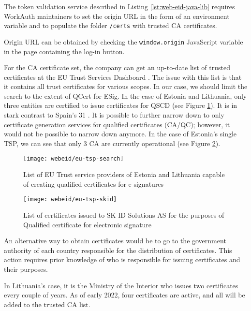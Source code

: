 The token validation service described in Listing \ref{lst:web-eid-java-lib} requires WorkAuth maintainers to set the origin URL in the form of an environment variable and to populate the folder \texttt{/certs} with trusted CA certificates.

Origin URL can be obtained by checking the \texttt{window.origin} JavaScript variable in the page containing the log-in button.

For the CA certificate set, the company can get an up-to-date list of trusted certificates at the EU Trust Services Dashboard \cite{eu-trustservices}. The issue with this list is that it contains all trust certificates for various scopes. In our case, we should limit the search to the extent of QCert for ESig. In the case of Estonia and Lithuania, only three entities are certified to issue certificates for QSCD (see Figure \ref{fig:eu-tsp-list}). It is in stark contrast to Spain's 31 \cite{eu-trustservices}. It is possible to further narrow down to only certificate generation services for qualified certificates (CA/QC); however, it would not be possible to narrow down anymore. In the case of Estonia's single TSP, we can see that only 3 CA are currently operational (see Figure \ref{fig:eu-tsp-skid}).

\begin{figure}
  \centering
  \texttt{[image: webeid/eu-tsp-search]}
  \caption{List of EU Trust service providers of Estonia and Lithuania capable of creating qualified certificates for e-signatures}
  \label{fig:eu-tsp-list}
\end{figure}

\begin{figure}
  \centering
  \texttt{[image: webeid/eu-tsp-skid]}
  \caption{List of certificates issued to SK ID Solutions AS for the purposes of Qualified certificate for electronic signature}
  \label{fig:eu-tsp-skid}
\end{figure}

An alternative way to obtain certificates would be to go to the government authority of each country responsible for the distribution of certificates. This action requires prior knowledge of who is responsible for issuing certificates and their purposes.

In Lithuania's case, it is the Ministry of the Interior \cite{eid-lt-ministryofinterior-certificates} who issues two certificates every couple of years. As of early 2022, four certificates are active, and all will be added to the trusted CA list.

